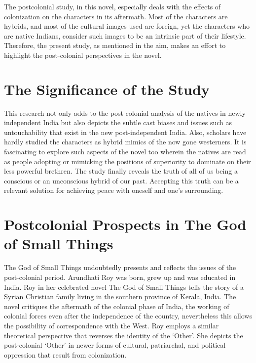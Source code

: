 The postcolonial study, in this novel, especially deals with the effects of colonization on the characters in its aftermath. Most of the characters are hybrids, and most of the cultural images used are foreign, yet the characters who are native Indians, consider such images to be an intrinsic part of their lifestyle. Therefore, the present study, as mentioned in the aim, makes an effort to highlight the post-colonial perspectives in the novel.

\section{The Significance of the Study}

This research not only adds to the post-colonial analysis of the natives in newly independent India but also depicts the subtle cast biases and issues such as untouchability that exist in the new post-independent India. Also, scholars have hardly studied the characters as hybrid mimics of the now gone westerners. It is fascinating to explore such aspects of the novel too wherein the natives are read as people adopting or mimicking the positions of superiority to dominate on their less powerful brethren. The study finally reveals the truth of all of us being a conscious or an unconscious hybrid of our past. Accepting this truth can be a relevant solution for achieving peace with oneself and one’s surrounding.

\section{Postcolonial Prospects in The God of Small Things}

The God of Small Things undoubtedly presents and reflects the issues of the post-colonial period. Arundhati Roy was born, grew up and was educated in India. Roy in her celebrated novel The God of Small Things tells the story of a Syrian Christian family living in the southern province of Kerala, India. The novel critiques the aftermath of the colonial phase of India, the working of colonial forces even after the independence of the country, nevertheless this allows the possibility of correspondence with the West.  Roy employs a similar theoretical perspective that reverses the identity of the ‘Other’. She depicts the post-colonial ‘Other’ in newer forms of cultural, patriarchal, and political oppression that result from colonization.

